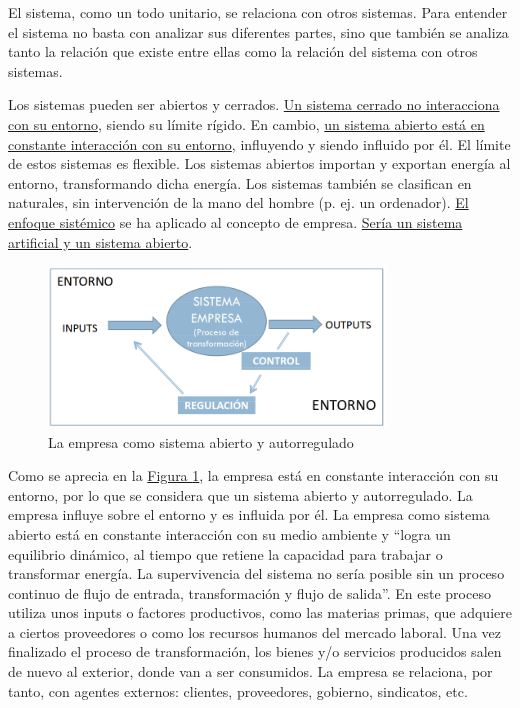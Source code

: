 \documentclass[12pt,a4paper,spanish]{report}
\begin{document}
			El sistema, como un todo unitario, se relaciona con otros sistemas. Para entender el sistema no basta con analizar sus diferentes partes, sino que también se analiza tanto la relación que existe entre ellas como la relación del sistema con otros sistemas.

			Los sistemas pueden ser abiertos y cerrados. \underline{Un sistema cerrado no interacciona con su entorno}, siendo su límite rígido. En cambio, \underline{un sistema abierto está en constante interacción con su entorno}, influyendo y siendo influido por él. El límite de estos sistemas es flexible. Los sistemas abiertos importan y exportan energía al entorno, transformando dicha energía. Los sistemas también se clasifican en naturales, sin intervención de la mano del hombre (p. ej. un ordenador). \underline{El enfoque sistémico} se ha aplicado al concepto de empresa. \underline{Sería un sistema artificial y un sistema abierto}.

			 \begin{figure}
			 	\centering
			 		\includegraphics[width=0.8\textwidth]{1}
			 	\caption{La empresa como sistema abierto y autorregulado}
			 	\label{empresa_abierta_regulada}
			 \end{figure}

			Como se aprecia en la \hyperref[empresa_abierta_regulada]{Figura \ref*{empresa_abierta_regulada}}, la empresa está en constante interacción con su entorno, por lo que se considera que un sistema abierto y autorregulado. La empresa influye sobre el entorno y es influida por él. La empresa como sistema abierto está en constante interacción con su medio ambiente y ``logra un equilibrio dinámico, al tiempo que retiene la capacidad para trabajar o transformar energía. La supervivencia del sistema no sería posible sin un proceso continuo de flujo de entrada, transformación y flujo de salida''. En este proceso utiliza unos inputs o factores productivos, como las materias primas, que adquiere a ciertos proveedores o como los recursos humanos del mercado laboral. Una vez finalizado el proceso de transformación, los bienes y/o servicios producidos salen de nuevo al exterior, donde van a ser consumidos. La empresa se relaciona, por tanto, con agentes externos: clientes, proveedores, gobierno, sindicatos, etc.
\end{document}
